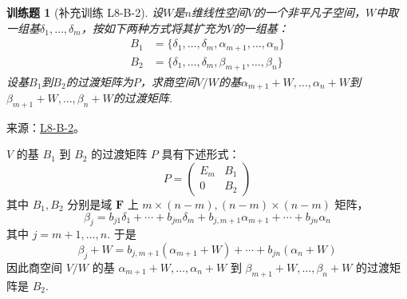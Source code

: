 \documentclass[UTF8,12pt,a4paper,fontset=fandol]{ctexart}
\newtheorem{exercise}{训练题}[section]
\begin{document}
\begin{exercise}[补充训练 L8-B-2]\label{prob:L8-B-2}
设$W$是$n$维线性空间$V$的一个非平凡子空间，$W$中取一组基$\delta_1,\ldots,\delta_m$，按如下两种方式将其扩充为$V$的一组基：
        \begin{align*}
            B_1 & =\{\delta_1,\ldots,\delta_m,\alpha_{m+1},\ldots,\alpha_n\} \\
            B_2 & =\{\delta_1,\ldots,\delta_m,\beta_{m+1},\ldots,\beta_n\}
        \end{align*}
        设基$B_1$到$B_2$的过渡矩阵为$P$，求商空间$V/W$的基$\alpha_{m+1}+W,\ldots,\alpha_n+W$到$\beta_{m+1}+W,\ldots,\beta_n+W$的过渡矩阵.
\end{exercise}
\noindent 来源：\href{https://github.com/yhwu-is/Linear-Algebra-Left-Undone/blob/new/%E8%AE%B2%E4%B9%89/%E4%B8%93%E9%A2%98/8%20%E7%9B%B8%E6%8A%B5%E6%A0%87%E5%87%86%E5%BD%A2.tex}{L8-B-2}。
\begin{solve}
$V$ 的基 $B_1$ 到 $B_2$ 的过渡矩阵 $P$ 具有下述形式：
          \[P=\begin{pmatrix}E_m & B_1 \\ 0 & B_2\end{pmatrix}\]
          其中 $B_1,B_2$ 分别是域 $\mathbf{F}$ 上 $m\times (n-m),(n-m)\times (n-m)$ 矩阵，
          \[\beta_j=b_{j1}\delta_1+\cdots+b_{jm}\delta_m+b_{j,m+1}\alpha_{m+1}+\cdots+b_{jn}\alpha_n\]
          其中 $j=m+1,\ldots,n$. 于是
          \[\beta_j+W=b_{j,m+1}(\alpha_{m+1}+W)+\cdots+b_{jn}(\alpha_n+W)\]
          因此商空间 $V/W$ 的基 $\alpha_{m+1}+W,\ldots,\alpha_n+W$ 到 $\beta_{m+1}+W,\ldots,\beta_n+W$ 的过渡矩阵是 $B_2$.
\end{solve}
\end{document}
